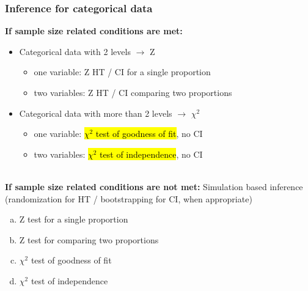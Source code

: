 \documentclass[11pt,containsverbatim,handout,xcolor=xelatex,dvipsnames,table]{beamer}
\newcommand{\solnMult}[1]{#1}
\newcommand{\soln}[1]{}
\begin{document}
\begin{frame}
\frametitle{Inference for categorical data}

\textbf{If sample size related conditions are met:}

\pause

\begin{itemize}

\item Categorical data with 2 levels $\rightarrow$ Z

\pause

\begin{itemize}
\item one variable: Z HT  / CI for a single proportion
\item two variables: Z HT  / CI  comparing two proportions
\end{itemize} 

\pause

\item Categorical data with more than 2 levels $\rightarrow$ $\chi^2$

\pause

\begin{itemize}
\item one variable: \hl{$\chi^2$ test of goodness of fit}, no CI
\item two variables: \hl{$\chi^2$ test of independence}, no CI
\end{itemize} 

\end{itemize}

\pause
$\:$ \\

\textbf{If sample size related conditions are not met:} \pause Simulation based inference (randomization for HT / bootstrapping for CI, when appropriate)

\end{frame}


\begin{frame}


\begin{enumerate}[(a)]
\item Z test for a single proportion
\item Z test for comparing two proportions
\item \solnMult{$\chi^2$ test of goodness of fit}
\item $\chi^2$ test of independence
\end{enumerate}

\pause
$\:$ \\

\soln{\only<2|handout:0>{\red{ $H_0:$ Each outcome is equally likely, $p_1 = p_2 = \cdots = p_{50} = 1/59$ }}}

\end{frame}
\end{document}

